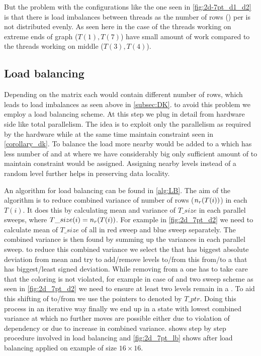   But the problem with the configurations like the one seen in \cref{fig:2d-7pt_d1_d2} is that there is load imbalances between threads as the number of rows (\nrows) per \levelGroup is not distributed evenly. As seen here in the case of \STEX the threads working on extreme ends of graph (\eg $T(1), T(7)$) have small amount of work compared to the threads working on middle (\eg $T(3), T(4)$). 
  
  \subsection{Load balancing}\label{subsec:LB}
  Depending on the matrix each \levelGroup would contain different number of rows, which leads to load imbalances as seen above in \cref{subsec:DK}. \Inorder to avoid this problem we employ a load balancing scheme. At this step we plug in detail from hardware side like total parallelism. The idea is to exploit only the parallelism as required by the hardware while at the same time maintain \DK constraint seen in \cref{corollary_dk}. To balance the load more nearby \levels would be added to a \levelGroup which has less number of \nrows and at \levelGroup where we have considerably big \levels only sufficient amount of \levels to maintain \DK constraint would be assigned. Assigning nearby levels instead of a random level further helps in preserving data locality. 
  
  An algorithm for load balancing can be found in \cref{alg:LB}. The aim of the algorithm is to reduce combined variance of number of rows ($n_{r}(T(i))$) in each \levelGroup $T(i)$. It does this by calculating mean and variance of $T\_size$ in each parallel sweeps, where $T\_size(i)=n_{r}(T(i))$. For example in \cref{fig:2d_7pt_d2} we need to calculate mean of $T\_size$ of all \levelGroups in red sweep and blue sweep separately. The combined variance is then found by summing up the variances in each parallel sweep. \Inorder to reduce this combined variance we select the \levelGroup that has biggest absolute deviation from mean and try to add/remove levels to/from this \levelGroup from/to a \levelGroup that has biggest/least signed deviation. While removing \levels from a \levelGroup one has to take care that the \DK coloring is not violated, for example in case of \DTWO and two sweep scheme as seen in \cref{fig:2d_7pt_d2} we need to ensure at least two levels remain in a \levelGroup. To aid this shifting of \levels to/from \levelGroup we use the pointers to \levelGroup denoted by $T\_ptr$. Doing this process in an iterative way finally we end up in a state with lowest combined variance at which no further moves are possible either due to violation of \DK dependency or due to increase in combined variance.  shows step by step procedure involved in load balancing and \cref{fig:2d_7pt_lb} shows \levelGroups after load balancing applied on \STEX example of size $16 \times 16.$

